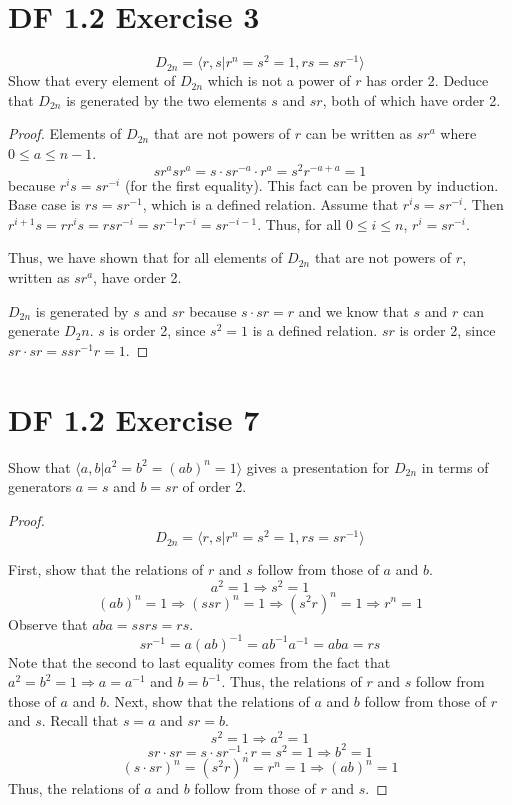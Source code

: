 \documentclass{article}
\begin{document}
\section{DF 1.2 Exercise 3}
\[
D_{2n} = \langle r, s | r^n = s^2 = 1, rs = sr^{-1} \rangle
\]
Show that every element of $D_{2n}$ which is not a power of $r$ has order 2. Deduce that $D_{2n}$ is generated by the two elements $s$ and $sr$, both of which have order 2.
\begin{proof}
Elements of $D_{2n}$ that are not powers of $r$ can be written as $sr^a$ where $0 \leq a \leq n-1$.
\[
sr^a sr^a = s \cdot sr^{-a} \cdot r^a = s^2 r^{-a+a} = 1
\] because $r^i s = sr^{-i}$ (for the first equality). This fact can be proven by induction. Base case is $rs=sr^{-1}$, which is a defined relation. Assume that $r^is=sr^{-i}$. Then $r^{i+1}s=rr^is=rsr^{-i}=sr^{-1}r^{-i}=sr^{-i-1}$. Thus, for all $0 \leq i \leq n$, $r^i = sr^{-i}$.

Thus, we have shown that for all elements of $D_{2n}$ that are not powers of $r$, written as $sr^a$, have order 2.

$D_{2n}$ is generated by $s$ and $sr$ because $s \cdot sr = r$ and we know that $s$ and $r$ can generate $D_2n$. $s$ is order 2, since $s^2=1$ is a defined relation. $sr$ is order 2, since $sr \cdot sr = ssr^{-1}r=1$.
\end{proof}

\section{DF 1.2 Exercise 7}
Show that $\langle a, b | a^2 = b^2 = (ab)^n = 1 \rangle$ gives a presentation for $D_{2n}$ in terms of generators $a=s$ and $b=sr$ of order 2.
\begin{proof}
\[
D_{2n} = \langle r, s | r^n = s^2 = 1, rs = sr^{-1} \rangle
\]

First, show that the relations of $r$ and $s$ follow from those of $a$ and $b$.
\[
a^2 = 1 \Rightarrow s^2 = 1
\]
\[
(ab)^n = 1 \Rightarrow (ssr)^n = 1 \Rightarrow (s^2r)^n = 1 \Rightarrow r^n = 1
\]
Observe that $aba = ssrs = rs$.
\[
sr^{-1} = a(ab)^{-1} = ab^{-1}a^{-1} = aba = rs
\]
Note that the second to last equality comes from the fact that $a^2=b^2=1 \Rightarrow a = a^{-1}$ and $b=b^{-1}$.
Thus, the relations of $r$ and $s$ follow from those of $a$ and $b$.
Next, show that the relations of $a$ and $b$ follow from those of $r$ and $s$. Recall that $s=a$ and $sr=b$.
\[s^2 = 1 \Rightarrow a^2 = 1\]
\[sr \cdot sr = s \cdot sr^{-1} \cdot r = s^2 = 1 \Rightarrow b^2 = 1\]
\[(s \cdot sr)^n = (s^2 r)^n = r^n = 1 \Rightarrow (ab)^n = 1 \]
Thus, the relations of $a$ and $b$ follow from those of $r$ and $s$.
\end{proof}
\end{document}
